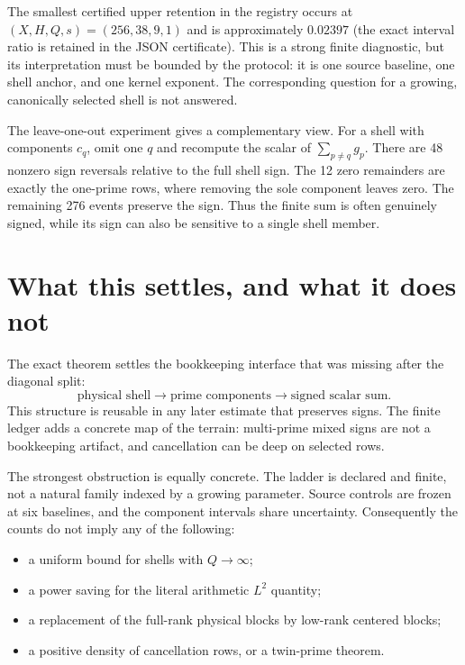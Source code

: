 \documentclass[11pt]{article}
\newcommand{\1}{\mathbf{1}}
\begin{document}
The smallest certified upper retention in the registry occurs at
$(X,H,Q,s)=(256,38,9,1)$ and is approximately $0.02397$ (the exact interval
ratio is retained in the JSON certificate).  This is a strong finite
diagnostic, but its interpretation must be bounded by the protocol: it is one
source baseline, one shell anchor, and one kernel exponent.  The corresponding
question for a growing, canonically selected shell is not answered.

The leave-one-out experiment gives a complementary view.  For a shell with
components $c_q$, omit one $q$ and recompute the scalar of
$\sum_{p\ne q}g_p$.  There are 48 nonzero sign reversals relative to the full
shell sign.  The 12 zero remainders are exactly the one-prime rows, where
removing the sole component leaves zero.  The remaining 276 events preserve
the sign.  Thus the finite sum is often genuinely signed, while its sign can
also be sensitive to a single shell member.

\section{What this settles, and what it does not}

The exact theorem settles the bookkeeping interface that was missing after the
diagonal split:
\[
 \text{physical shell}
 \longrightarrow
 \text{prime components}
 \longrightarrow
 \text{signed scalar sum}.
\]
This structure is reusable in any later estimate that preserves signs.  The
finite ledger adds a concrete map of the terrain: multi-prime mixed signs are
not a bookkeeping artifact, and cancellation can be deep on selected rows.

The strongest obstruction is equally concrete.  The ladder is declared and
finite, not a natural family indexed by a growing parameter.  Source controls
are frozen at six baselines, and the component intervals share uncertainty.
Consequently the counts do not imply any of the following:

\begin{itemize}[leftmargin=1.8em,itemsep=2pt]
  \item a uniform bound for shells with $Q\to\infty$;
  \item a power saving for the literal arithmetic $L^2$ quantity;
  \item a replacement of the full-rank physical blocks by low-rank centered
        blocks;
  \item a positive density of cancellation rows, or a twin-prime theorem.
\end{itemize}
\end{document}
